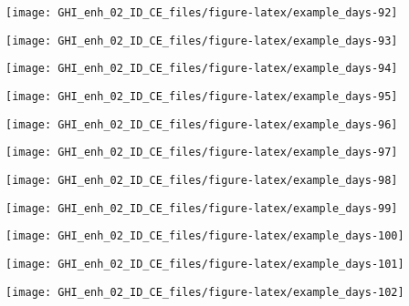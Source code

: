 \documentclass[
  10pt,
  a4paper,oneside]{article}
\begin{document}
\begin{center}\texttt{[image: GHI\_enh\_02\_ID\_CE\_files/figure-latex/example\_days-92]} \end{center}

\begin{center}\texttt{[image: GHI\_enh\_02\_ID\_CE\_files/figure-latex/example\_days-93]} \end{center}

\begin{center}\texttt{[image: GHI\_enh\_02\_ID\_CE\_files/figure-latex/example\_days-94]} \end{center}

\begin{center}\texttt{[image: GHI\_enh\_02\_ID\_CE\_files/figure-latex/example\_days-95]} \end{center}

\begin{center}\texttt{[image: GHI\_enh\_02\_ID\_CE\_files/figure-latex/example\_days-96]} \end{center}

\begin{center}\texttt{[image: GHI\_enh\_02\_ID\_CE\_files/figure-latex/example\_days-97]} \end{center}

\begin{center}\texttt{[image: GHI\_enh\_02\_ID\_CE\_files/figure-latex/example\_days-98]} \end{center}

\begin{center}\texttt{[image: GHI\_enh\_02\_ID\_CE\_files/figure-latex/example\_days-99]} \end{center}

\begin{center}\texttt{[image: GHI\_enh\_02\_ID\_CE\_files/figure-latex/example\_days-100]} \end{center}

\begin{center}\texttt{[image: GHI\_enh\_02\_ID\_CE\_files/figure-latex/example\_days-101]} \end{center}

\begin{center}\texttt{[image: GHI\_enh\_02\_ID\_CE\_files/figure-latex/example\_days-102]} \end{center}
\end{document}
